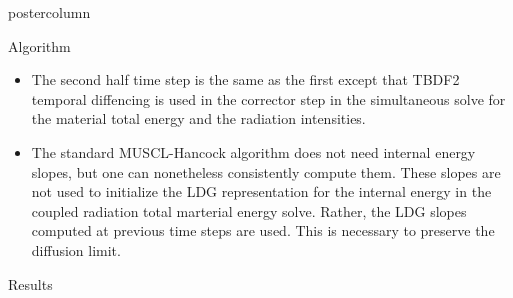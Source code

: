 \documentclass[xcolor=dvipsnames]{beamer}
\begin{document}
\begin{frame}
\begin{columns}
\begin{column}{.49\textwidth}
\begin{beamercolorbox}[center,wd=\textwidth]{postercolumn}
\begin{minipage}[T]{0.95\textwidth}
{\begin{block}{Algorithm}
\begin{itemize}
      \item The second half time step is the same as the first except that TBDF2 temporal diffencing is used in the corrector step 
      in the simultaneous solve for the material total energy and the radiation intensities.
    \item The standard MUSCL-Hancock algorithm does not need internal energy slopes, but one can nonetheless 
          consistently compute them.  These slopes are not used to initialize the LDG representation for the 
          internal energy in the coupled radiation total marterial energy solve.  Rather, the LDG slopes computed 
          at previous time steps are used.  This is necessary to preserve the diffusion limit.
    \end{itemize}
	\end{block}
    \vfill
\begin{block}{Results}


\end{block}}
\end{minipage}
\end{beamercolorbox}
\end{column}
\end{columns}
\end{frame}
\end{document}
